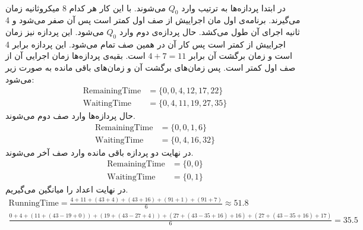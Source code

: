 \\
در ابتدا پردازه‌ها به ترتیب وارد
$Q_0$
می‌شوند. با این کار هر کدام 8 میکروثانیه زمان می‌گیرند.
برنامه‌ی اول مان اجراییش از
صف اول کمتر است پس
آن صفر می‌شود و 4 ثانیه اجرای آن طول می‌کشد.
حال پردازه‌ی دوم وارد
$Q_0$
می‌شود. این پردازه نیز زمان اجراییش از
کمتر است پس کار آن در همین صف تمام می‌شود.
این پردازه برابر 4 است و زمان برگشت آن برابر
$4 + 7 = 11$
است. بقیه‌ی پردازه‌ها زمان اجرایی آن از
صف اول کمتر است. پس زمان‌های برگشت آن و زمان‌های باقی مانده به صورت زیر می‌شود:
\begin{align*}
    \text{RemainingTime} &= \{0, 0, 4, 12, 17, 22\}\\
    \text{WaitingTime} &= \{0, 4, 11, 19, 27, 35\} %
\end{align*}
حال پردازه‌ها وارد صف دوم می‌شوند. 
\begin{align*}
    \text{RemainingTime} &= \{0, 0, 1, 6\}\\
    \text{WaitingTime} &= \{0, 4, 16, 32\} %
\end{align*}
در نهایت دو پردازه باقی مانده وارد صف آخر می‌شوند.
\begin{align*}
    \text{RemainingTime} &= \{0, 0\}\\
    \text{WaitingTime} &= \{0, 1\}
\end{align*}
در نهایت اعداد را میانگین می‌گیریم.
\begin{gather*}
    \text{RunningTime} = \frac{4 + 11 + (43 + 4) + (43 + 16) + (91 + 1) + (91 + 7)}{6} \approx 51.8\\
    \frac{0 + 4 + (11 + (43 - 19 + 0)) + (19 + (43 - 27 + 4)) + (27 + (43 - 35 + 16) + 16) + (27 + (43 - 35 + 16) + 17)}{6} = 35.5 
\end{gather*}